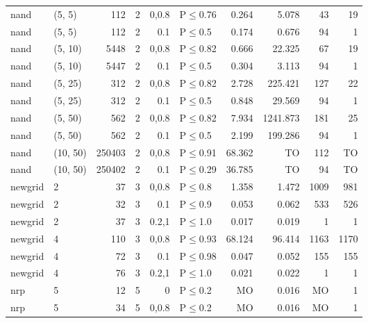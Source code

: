 \begin{longtable}{llrrrlrrrr}
 nand          & (5, 5)   &    	112 &   2 & 0,0.8 & P$\leq$0.76  & 0.264   & 5.078    & 43     & 19     \\
 nand          & (5, 5)   &    	112 &   2 & 0.1   & P$\leq$0.5   & 0.174   & 0.676    & 94     & 1      \\
 nand          & (5, 10)  &   	5448 &   2 & 0,0.8 & P$\leq$0.82  & 0.666   & 22.325   & 67     & 19     \\
 nand          & (5, 10)  &   	5447 &   2 & 0.1   & P$\leq$0.5   & 0.304   & 3.113    & 94     & 1      \\
 nand          & (5, 25)  &    	312 &   2 & 0,0.8 & P$\leq$0.82  & 2.728   & 225.421  & 127    & 22     \\
 nand          & (5, 25)  &    	312 &   2 & 0.1   & P$\leq$0.5   & 0.848   & 29.569   & 94     & 1      \\
 nand          & (5, 50)  &    	562 &   2 & 0,0.8 & P$\leq$0.82  & 7.934   & 1241.873 & 181    & 25     \\
 nand          & (5, 50)  &    	562 &   2 & 0.1   & P$\leq$0.5   & 2.199   & 199.286  & 94     & 1      \\
 nand          & (10, 50) & 	250403 &   2 & 0,0.8 & P$\leq$0.91  & 68.362  & TO       & 112    & TO     \\
 nand          & (10, 50) & 	250402 &   2 & 0.1   & P$\leq$0.29  & 36.785  & TO       & 94     & TO     \\
 newgrid       & 2        &     	37 &   3 & 0,0.8 & P$\leq$0.8   & 1.358   & 1.472    & 1009   & 981    \\
 newgrid       & 2        &     	32 &   3 & 0.1   & P$\leq$0.9   & 0.053   & 0.062    & 533    & 526    \\
 newgrid       & 2        &     	37 &   3 & 0.2,1 & P$\leq$1.0   & 0.017   & 0.019    & 1      & 1      \\
 newgrid       & 4        &    	110 &   3 & 0,0.8 & P$\leq$0.93  & 68.124  & 96.414   & 1163   & 1170   \\
 newgrid       & 4        &     	72 &   3 & 0.1   & P$\leq$0.98  & 0.047   & 0.052    & 155    & 155    \\
 newgrid       & 4        &     	76 &   3 & 0.2,1 & P$\leq$1.0   & 0.021   & 0.022    & 1      & 1      \\
 nrp           & 5        &     	12 &   5 & 0     & P$\leq$0.2   & MO      & 0.016    & MO     & 1      \\
 nrp           & 5        &     	34 &   5 & 0,0.8 & P$\leq$0.2   & MO      & 0.016    & MO     & 1      \\

\end{longtable}
